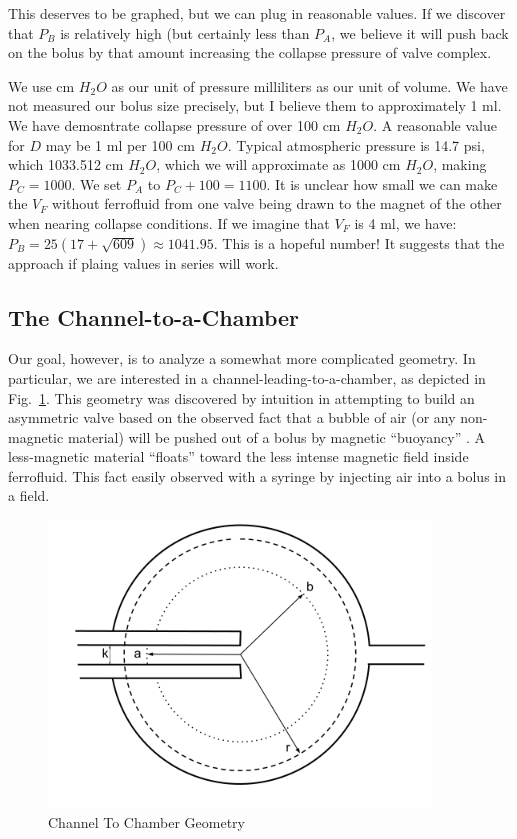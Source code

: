 \documentclass{asme2ej}
\begin{document}
This deserves to be graphed, but we can plug in reasonable values.
If we discover that $P_B$ is relatively high (but certainly less than
$P_A$, we believe it will push back on the bolus by that amount increasing
the collapse pressure of valve complex.

We use cm $H_2O$ as our unit of pressure milliliters as our unit of volume.
We have not measured our bolus size precisely, but I believe them to approximately 1 ml. We have demosntrate collapse pressure of over 100 cm $H_2O$.
A reasonable value for $D$ may be 1 ml per 100 cm $H_2O$.
Typical atmospheric pressure is 14.7 psi, which 1033.512 cm $H_2O$, which
we will approximate as 1000 cm $H_2O$, making $P_C = 1000$.
We set $P_A$ to $P_C + 100 = 1100$.
It is unclear how small we can make the $V_F$ without ferrofluid
from one valve being drawn to the magnet of the other when nearing collapse
conditions. If we imagine that $V_F$ is 4 ml, we have:
$P_B  =  25 (17 + \sqrt{609})\approx 1041.95$. This is a hopeful number!
It suggests that the approach if plaing values in series will work.



\subsection{The Channel-to-a-Chamber}

Our goal, however, is to analyze a somewhat more complicated geometry.
In particular, we are interested in a channel-leading-to-a-chamber,
as depicted in Fig.~\ref{fig:ChannelToChamber}.
This geometry was discovered by intuition in attempting to build an asymmetric valve
based on the observed fact that a bubble of air (or any non-magnetic material) will
be pushed out of a bolus by magnetic ``buoyancy'' \cite{wakayama1997magnetic,cheng2014three}.
A less-magnetic material ``floats'' toward the less intense magnetic field inside
ferrofluid. This fact easily observed with a syringe by injecting air into a bolus
in a field.

\begin{figure}
\centerline{\includegraphics[width=4in]{figure/ChannelToChamber.png}}
\caption{Channel To Chamber Geometry}
\label{fig:ChannelToChamber}
\end{figure}
\end{document}

